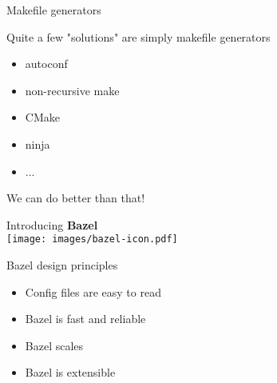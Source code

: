 \documentclass[11pt]{beamer}
\begin{document}
\begin{frame}{Makefile generators}

  Quite a few "solutions" are simply makefile generators

  \begin{itemize}
    \item autoconf
    \item non-recursive make
    \item CMake
    \item ninja
    \item ...
  \end{itemize}

  We can do better than that!

\end{frame}

\begin{frame}[plain]
  \begin{center}
    {\Large Introducing {\bfseries\color{bazelGreen}Bazel}} \\[1cm]
    \texttt{[image: images/bazel-icon.pdf]}
  \end{center}
\end{frame}

\begin{frame}{Bazel design principles}

  \begin{itemize} \setlength\itemsep{1em}
    \item Config files are easy to read
    \item \alert{Bazel} is fast and reliable
    \item \alert{Bazel} scales
    \item \alert{Bazel} is extensible
  \end{itemize}

  \BazelNavIcon{}
\end{frame}
\end{document}
